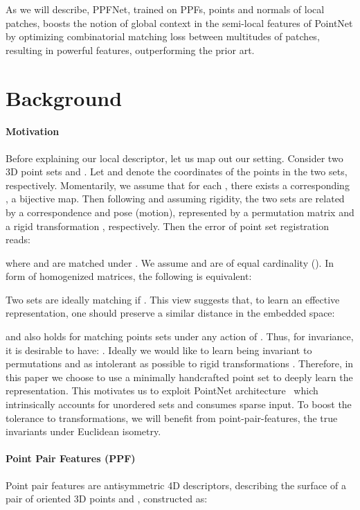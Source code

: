 \documentclass[10pt,twocolumn,letterpaper]{article}
\theoremstyle{break}
\begin{document}
As we will describe, PPFNet, trained on PPFs, points and normals of local patches, boosts the notion of global context in the semi-local features of PointNet by optimizing combinatorial matching loss between multitudes of patches, resulting in powerful features, outperforming the prior art.
 \section{Background}
\paragraph{Motivation}
Before explaining our local descriptor, let us map out our setting.
Consider two 3D point sets  and . Let  and  denote the coordinates of the  points in the two sets, respectively. Momentarily, we assume that for each , there exists a corresponding , a bijective map. Then following \cite{li20073d} and assuming rigidity, the two sets are related by a correspondence and pose (motion), represented by a permutation matrix  and a rigid transformation , respectively. Then the  error of point set registration reads:

where  and  are matched under .
We assume  and  are of equal cardinality (). 
In form of homogenized matrices, the following is equivalent:

Two sets are ideally matching if . This view suggests that, to learn an effective representation, one should preserve a similar distance in the embedded space:

and  also holds for matching points sets under any action of . Thus, for invariance, it is desirable to have: . Ideally we would like to learn  being invariant to permutations  and as intolerant as possible to rigid transformations . Therefore, in this paper we choose to use a minimally handcrafted point set to deeply learn the representation. This motivates us to exploit PointNet architecture~\cite{qi2016pointnet} which intrinsically accounts for unordered sets and consumes sparse input. To boost the tolerance to transformations, we will benefit from point-pair-features, the true invariants under Euclidean isometry.
\vspace{-3mm}
\paragraph{Point Pair Features (PPF)}
Point pair features are antisymmetric 4D descriptors, describing the surface of a pair of oriented 3D points  and , constructed as:
\end{document}
